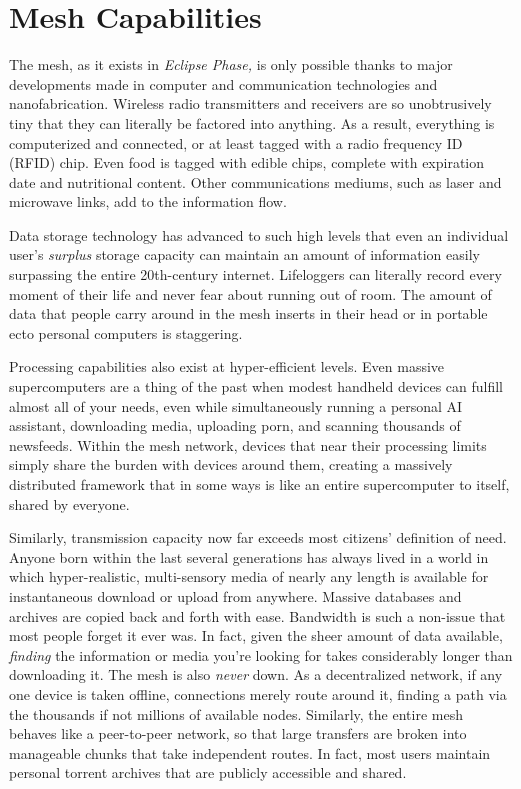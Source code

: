 \section{Mesh Capabilities}

The mesh, as it exists in \textit{Eclipse Phase,} is only possible 
thanks to major developments made in computer and 
communication technologies and nanofabrication. 
Wireless radio transmitters and receivers are so unobtrusively
tiny that they can literally be factored into
anything. As a result, everything is computerized and 
connected, or at least tagged with a radio frequency 
ID (RFID) chip. Even food is tagged with edible chips, 
complete with expiration date and nutritional content. 
Other communications mediums, such as laser and 
microwave links, add to the information flow.

Data storage technology has advanced to such high 
levels that even an individual user's \textit{surplus }storage 
capacity can maintain an amount of information 
easily surpassing the entire 20th-century internet. 
Lifeloggers can literally record every moment of their 
life and never fear about running out of room. The 
amount of data that people carry around in the mesh 
inserts in their head or in portable ecto personal computers
is staggering.

Processing capabilities also exist at hyper-efficient 
levels. Even massive supercomputers are a thing of the 
past when modest handheld devices can fulfill almost 
all of your needs, even while simultaneously running a 
personal AI assistant, downloading media, uploading 
porn, and scanning thousands of newsfeeds. Within 
the mesh network, devices that near their processing 
limits simply share the burden with devices around 
them, creating a massively distributed framework that 
in some ways is like an entire supercomputer to itself, 
shared by everyone.

Similarly, transmission capacity now far exceeds 
most citizens' definition of need. Anyone born within 
the last several generations has always lived in a world 
in which hyper-realistic, multi-sensory media of nearly 
any length is available for instantaneous download 
or upload from anywhere. Massive databases and 
archives are copied back and forth with ease. Bandwidth
is such a non-issue that most people forget it ever
was. In fact, given the sheer amount of data available, 
\textit{finding }the information or media you're looking for 
takes considerably longer than downloading it. The 
mesh is also \textit{never }down. As a decentralized network, 
if any one device is taken offline, connections merely 
route around it, finding a path via the thousands if not 
millions of available nodes. Similarly, the entire mesh 
behaves like a peer-to-peer network, so that large transfers
are broken into manageable chunks that take independent
routes. In fact, most users maintain personal
torrent archives that are publicly accessible and shared.

